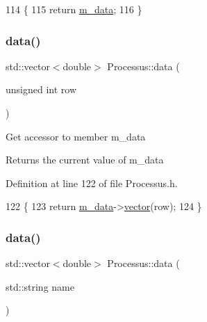 \begin{DoxyCode}
114               \{
115     \textcolor{keywordflow}{return} \hyperlink{classProcessus_a3da9a9de8af54e2f47807a3e09dfccff}{m\_data};
116   \}
\end{DoxyCode}
\mbox{\label{classProcessus_aa7c57483cf4b9ab0b2d0ae2de8316402}} 
\subsubsection{\texorpdfstring{data()}{data()}\hspace{0.1cm}{\footnotesize\ttfamily [2/3]}}
{\footnotesize\ttfamily std\+::vector$<$double$>$ Processus\+::data (\begin{DoxyParamCaption}\item[{unsigned int}]{row }\end{DoxyParamCaption})\hspace{0.3cm}{\ttfamily [inline]}}

Get accessor to member m\+\_\+data \begin{DoxyReturn}{Returns}
the current value of m\+\_\+data 
\end{DoxyReturn}


Definition at line 122 of file Processus.\+h.


\begin{DoxyCode}
122                                           \{
123     \textcolor{keywordflow}{return} \hyperlink{classProcessus_a3da9a9de8af54e2f47807a3e09dfccff}{m\_data}->\hyperlink{classData_a94e00cdd58c1d6f11487f1ac47fee4bc}{vector}(row);
124   \}
\end{DoxyCode}
\mbox{\label{classProcessus_abf4d91fb36707e1d50178bab12d21ae9}} 
\subsubsection{\texorpdfstring{data()}{data()}\hspace{0.1cm}{\footnotesize\ttfamily [3/3]}}
{\footnotesize\ttfamily std\+::vector$<$double$>$ Processus\+::data (\begin{DoxyParamCaption}\item[{std\+::string}]{name }\end{DoxyParamCaption})\hspace{0.3cm}{\ttfamily [inline]}}

